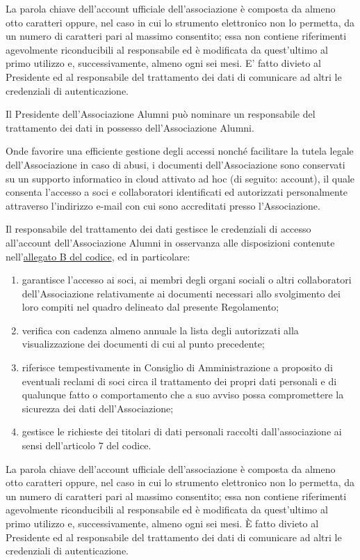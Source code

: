 La parola chiave dell’account ufficiale dell’associazione è composta da almeno otto caratteri oppure, nel caso in cui lo strumento elettronico non lo permetta, da un numero di caratteri pari al massimo consentito; essa non contiene riferimenti agevolmente riconducibili al responsabile ed è modificata da quest’ultimo al primo utilizzo e, successivamente, almeno ogni sei mesi. 
E’ fatto divieto al Presidente ed al responsabile del trattamento dei dati di comunicare ad altri le credenziali di autenticazione.

Il Presidente dell’Associazione Alumni può nominare un responsabile del trattamento dei dati in possesso dell’Associazione Alumni. 

Onde favorire una efficiente gestione degli accessi nonché facilitare la tutela legale dell’Associazione in caso di abusi, i documenti dell’Associazione sono conservati su un supporto informatico in cloud attivato ad hoc (di seguito: account), il quale consenta l’accesso a soci e collaboratori identificati ed autorizzati personalmente attraverso l’indirizzo e-mail con cui sono accreditati presso l’Associazione.

Il responsabile del trattamento dei dati gestisce le credenziali di accesso
all’account dell’Associazione Alumni in osservanza alle disposizioni
contenute nell’\href{http://www.garanteprivacy.it/web/guest/home/docweb/-/docweb-display/docweb/1557184}{allegato B del codice}, ed in particolare: 
\begin{enumerate}
    \item garantisce l’accesso ai soci, ai membri degli organi sociali o
        altri collaboratori dell’Associazione relativamente ai documenti
        necessari allo svolgimento dei loro compiti nel quadro delineato dal
        presente Regolamento;
    \item verifica con cadenza almeno annuale la lista degli autorizzati
        alla visualizzazione dei documenti di cui al punto precedente;
    \item riferisce tempestivamente in Consiglio di Amministrazione a
        proposito di eventuali reclami di soci circa il trattamento dei
        propri dati personali e di qualunque fatto o comportamento che a suo
        avviso possa compromettere la sicurezza dei dati dell’Associazione;
    \item gestisce le richieste dei titolari di dati personali raccolti
        dall’associazione ai sensi dell’articolo 7 del codice.
\end{enumerate}
 
La parola chiave dell’account ufficiale dell’associazione è composta da
almeno otto caratteri oppure, nel caso in cui lo strumento elettronico non
lo permetta, da un numero di caratteri pari al massimo consentito; essa non
contiene riferimenti agevolmente riconducibili al responsabile ed è
modificata da quest’ultimo al primo utilizzo e, successivamente, almeno ogni
sei mesi. È fatto divieto al Presidente ed al responsabile del trattamento
dei dati di comunicare ad altri le credenziali di autenticazione.
